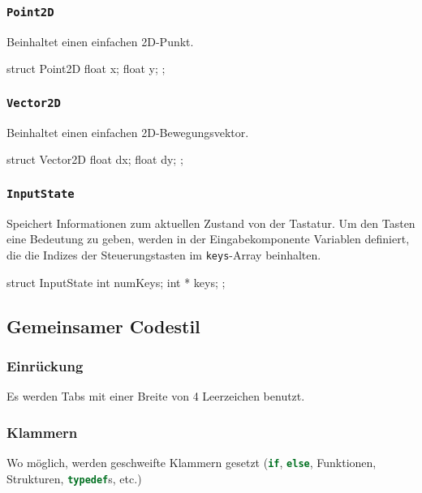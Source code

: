 \documentclass{homework-pp}
\renewcommand{\c}[1]{\lstinline[language=c,basicstyle=\ttfamily]|#1|}
\begin{document}
\subsubsection{\c{Point2D}}

Beinhaltet einen einfachen 2D-Punkt.

\begin{cblock}
struct Point2D {
	float x;
	float y;
};
\end{cblock}

\subsubsection{\c{Vector2D}}

Beinhaltet einen einfachen 2D-Bewegungsvektor.

\begin{cblock}
struct Vector2D {
	float dx;
	float dy;
};
\end{cblock}

\subsubsection{\c{InputState}}

Speichert Informationen zum aktuellen Zustand von der Tastatur. Um den Tasten eine Bedeutung zu geben, werden in der Eingabekomponente Variablen definiert, die die Indizes der Steuerungstasten im \c{keys}-Array beinhalten.

\begin{cblock}
struct InputState {
	int		numKeys;
	int *	keys;
};
\end{cblock}

\subsection{Gemeinsamer Codestil}

\subsubsection{Einrückung}

Es werden Tabs mit einer Breite von 4 Leerzeichen benutzt.

\subsubsection{Klammern}

Wo möglich, werden geschweifte Klammern gesetzt (\c{if}, \c{else}, Funktionen, Strukturen, \c{typedef}s, etc.)
\end{document}
